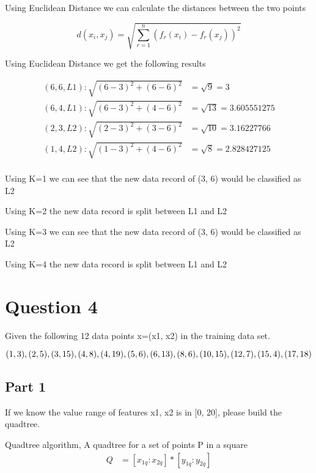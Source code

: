 \documentclass{report}
\begin{document}
Using Euclidean Distance we can calculate the distances between the two points

\begin{equation*}
  d(x_i, x_j) = \sqrt{\sum_{r=1}^{n}(f_r(x_i)-f_r(x_j))^2} 
\end{equation*}

Using Euclidean Distance we get the following results

\begin{equation*}
  \begin{split}
    (6, 6, L1): \sqrt{(6-3)^2 + (6-6)^2} & = \sqrt{9} = 3 \\
    (6, 4, L1): \sqrt{(6-3)^2 + (4-6)^2} & = \sqrt{13} = 3.605551275 \\
    (2, 3, L2): \sqrt{(2-3)^2 + (3-6)^2} & = \sqrt{10} = 3.16227766 \\
    (1, 4, L2): \sqrt{(1-3)^2 + (4-6)^2} & = \sqrt{8} = 2.828427125 \\
  \end{split}
\end{equation*}

Using K=1 we can see that the new data record of (3, 6) would be classified as L2

Using K=2 the new data record is split between L1 and L2

Using K=3 we can see that the new data record of (3, 6) would be classified as L2

Using K=4 the new data record is split between L1 and L2

\chapter{Question 4}

Given the following 12  data  points x=(x1, x2) in  the training  data  set.

\begin{equation*}
  (1, 3), (2, 5), (3, 15),  (4, 8), (4, 19),  (5, 6), (6, 13), \\
  (8, 6), (10,  15),  (12,  7), (15,  4), (17,  18)
\end{equation*}

\section{Part 1}
If  we  know  the value range of  features  x1, x2  is  in  [0, 20],  please  build the 
quadtree. 

Quadtree algorithm, A quadtree for a set of points P in a square
\begin{equation*}
  \begin{split}
    Q & = [x_{1q} : x_{2q}] * [y_{1q} : y_{2q}] \\
  \end{split}
\end{equation*}
\end{document}
